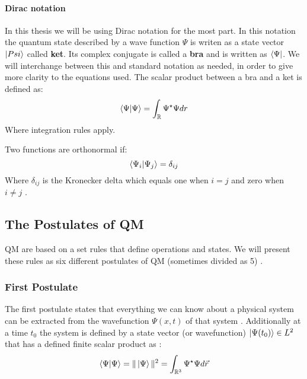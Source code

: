 \documentclass[../master_thesis.tex]{subfiles}
\begin{document}
\paragraph{Dirac notation}
In this thesis we will be using Dirac notation for the most part. In this notation
the quantum state described by a wave function $\Psi$ is writen as a state vector
$\ket{Psi}$ \cite{Atkins:2011} called \textbf{ket}. Its complex conjugate is called
a \textbf{bra} and is written as $\bra{\Psi}$. We will interchange between this and standard notation
as needed, in order to give more clarity to the equations used.
The scalar product between a bra and a ket is defined as:
\begin{equation}
  \braket{\Psi|\Psi} = \int_{\mathbb{R}} \Psi^{\star}\Psi dr \label{eq:diracscalpro}
\end{equation}
Where integration rules apply.

Two functions are orthonormal if:
\begin{equation}
    \braket{\Psi_i|\Psi_j} = \delta_{ij}
\end{equation}
Where $\delta_{ij}$ is the Kronecker delta which equals one when $i = j$ and
zero when $ i \neq j$ \cite{Atkins:2011, Cohen:1973}.
\subsection{The Postulates of \ac{QM}}

\ac{QM} are based on a set rules that define operations and states. We will
present these rules as six different postulates of \ac{QM} (sometimes divided
as 5) \cite{Atkins:2011, Cohen:1973}.

\subsubsection{First Postulate}
The first postulate states that everything we can know about a physical system
can be extracted from the wavefunction $\Psi(x, t)$ of that system
\cite{Atkins:2011}. Additionally at a time $t_0$ the system is defined by
a state vector (or wavefunction) $\ket{\Psi(t_0)}\in L^2$ that has a defined
finite scalar product as \cite{Cohen:1973}:
\begin{equation}
  \braket{\Psi|\Psi} = \|\ket{\Psi}\|^2 =  \int_{\mathbb{R}^3}\Psi^\star\Psi d\vec{r}
\end{equation}
\end{document}
